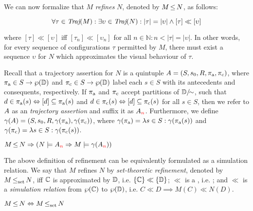 We can now formalize that $M$ \textit{refines} $N$, denoted by $M \operatorname{\leq} N$, as follows:

\begin{equation*}
\forall \tau \in \operatorname{\textit{Traj}}(M) : \exists \upsilon \in \operatorname{\textit{Traj}}(N) : | \tau | = | \upsilon | \wedge [\tau] \ll [\upsilon]
\end{equation*}

\noindent where $[\tau] \ll [\upsilon]$ iff $[\tau_{n}] \ll [\upsilon_{n}]$ for all $n \in \mathbb{N} : n < | \tau | = | \upsilon |$. In other words, for every sequence of configurations $\tau$ permitted by $M$, there must exist a sequence $\upsilon$ for $N$ which approximates the visual behaviour of $\tau$.

Recall that a trajectory assertion for $N$ is a quintuple $A = (S, s_{0}, R, \operatorname{\pi_{\textrm{a}}}, \operatorname{\pi_{\textrm{c}}})$, where $\operatorname{\pi_{\textrm{a}}} \in S \rightarrow \wp(\mathbb{D})$ and $\operatorname{\pi_{\textrm{c}}} \in S \rightarrow \wp(\mathbb{D})$ label each $s \in S$ with its antecedents and consequents, respectively. If $\operatorname{\pi_{\textrm{a}}}$ and $\operatorname{\pi_{\textrm{c}}}$ accept partitions of $\mathbb{D} / \mkern-8mu\sim$, such that $d \in \operatorname{\pi_{\textrm{a}}}(s) \Leftrightarrow [d] \subseteq \operatorname{\pi_{\textrm{a}}}(s)$ and $d \in \operatorname{\pi_{\textrm{c}}}(s) \Leftrightarrow [d] \subseteq \operatorname{\pi_{\textrm{c}}}(s)$ for all $s \in S$, then we refer to $A$ as an \textit{ trajectory assertion} and suffix it as $A_{\textcolor{red}{n}}$. Furthermore, we define $\gamma(A) = (S, s_{0}, R, \gamma(\operatorname{\pi_{\textrm{a}}}), \gamma(\operatorname{\pi_{\textrm{c}}}))$, where $\gamma(\operatorname{\pi_{\textrm{a}}}) = \lambda s \in S : \gamma(\operatorname{\pi_{\textrm{a}}}(s))$ and $\gamma(\operatorname{\pi_{\textrm{c}}}) = \lambda s \in S : \gamma(\operatorname{\pi_{\textrm{c}}}(s))$.


\begin{theorem} \label{thm:traj-refines}
$M \operatorname{\leq} N \Rightarrow (N \models A_{\textcolor{red}{n}} \Rightarrow M \models \gamma(A_{\textcolor{red}{n}}))$
\end{theorem}

The above definition of refinement can be equivalently formulated as a simulation relation. We say that $M$ refines $N$ by \textit{set-theoretic refinement}, denoted by $M \operatorname{\operatorname{\leq}_{\textrm{set}}} N$, iff $\mathbb{C}$ is approximated by $\mathbb{D}$, i.e. $\{ \mathbb{C} \} \ll \{ \mathbb{D} \}$; $\ll$ is a , i.e. ; and $\ll$ is a \textit{simulation relation} from $\wp(\mathbb{C})$ to $\wp(\mathbb{D})$, i.e. $C \ll D \implies M(C) \ll N(D)$.


\begin{theorem} \label{thm:traj-equal-set}
$M \operatorname{\leq} N \Leftrightarrow M \operatorname{\operatorname{\leq}_{\textrm{set}}} N$
\end{theorem}
